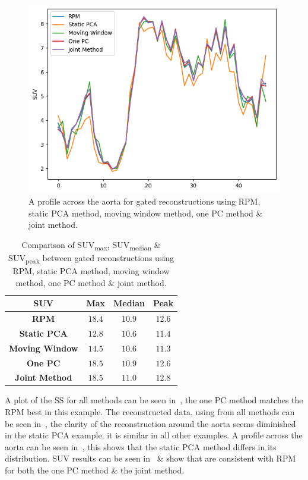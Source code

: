     \begin{figure}
        \centering
        \includegraphics[width=0.5\linewidth]{figures/profile_pca.png}
        \captionsetup{singlelinecheck=false, justification=centering}
        \caption{A profile across the aorta for gated reconstructions using \gls{RPM}, static \gls{PCA} method, moving window method, one \gls{PC} method \& joint method.}
        \label{fig:profile}
    \end{figure}
    
    \begin{table}
        \centering
        \captionsetup{singlelinecheck=false, justification=centering}
        \caption{Comparison of \gls{SUV}\textsubscript{max}, \gls{SUV}\textsubscript{median} \& \gls{SUV}\textsubscript{peak} between gated reconstructions using \gls{RPM}, static \gls{PCA} method, moving window method, one \gls{PC} method \& joint method.}
        
        \resizebox*{0.5\linewidth}{!}
        {
            \begin{tabular}{||c|ccc||}
                \hline
                \textbf{\gls{SUV}} & \textbf{Max} & \textbf{Median} & \textbf{Peak} \\
                \hline
                \textbf{\gls{RPM}}          & $18.4$ & $10.9$ & $12.6$ \\
                \hline
                \textbf{Static \gls{PCA}}   & $12.8$ & $10.6$ & $11.4$ \\
                \textbf{Moving Window}      & $14.5$ & $10.6$ & $11.3$ \\
                \textbf{One \gls{PC}}       & $18.5$ & $10.9$ & $12.6$ \\
                \textbf{Joint Method}       & $18.5$ & $11.0$ & $12.8$ \\
                \hline
            \end{tabular}
        }
        \label{tab:suv}
    \end{table}
    
    A plot of the \gls{SS} for all methods can be seen in~, the one \gls{PC} method matches the \gls{RPM} best in this example. The reconstructed data, using  from all methods can be seen in~, the clarity of the reconstruction around the aorta seems diminished in the static \gls{PCA} example, it is similar in all other examples. A profile across the aorta can be seen in~, this shows that the static \gls{PCA} method differs in its distribution. \gls{SUV} results can be seen in~ \& show that  are consistent with \gls{RPM} for both the one \gls{PC} method \& the joint method.
    
